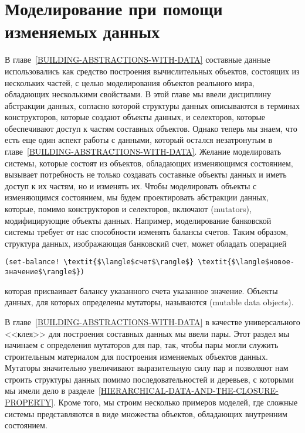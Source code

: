 \section{Моделирование при помощи изменяемых данных}%
\label{MODELING-WITH-MUTABLE-DATA}


В главе~\ref{BUILDING-ABSTRACTIONS-WITH-DATA}
составные данные использовались как средство построения вычислительных
объектов, состоящих из нескольких частей, с целью моделирования
объектов реального мира, обладающих несколькими свойствами. В этой
главе мы ввели дисциплину абстракции данных, согласно которой
структуры данных описываются в терминах конструкторов, которые создают
объекты данных, и селекторов, которые обеспечивают доступ к частям
составных объектов.  Однако теперь мы знаем, что есть еще один аспект
работы с данными, который остался незатронутым в
главе~\ref{BUILDING-ABSTRACTIONS-WITH-DATA}.  Желание
моделировать системы, которые состоят  из объектов, обладающих
изменяющимся состоянием, вызывает потребность не только создавать составные
объекты данных и иметь доступ к их частям, но и изменять их.
Чтобы моделировать объекты с изменяющимся состоянием, мы будем
проектировать абстракции данных, которые, помимо конструкторов и
селекторов, включают  (mutators),
модифицирующие объекты данных.  Например, моделирование банковской
системы требует от нас способности изменять балансы счетов.  Таким
образом, структура данных, изображающая банковский счет, может
обладать операцией

\begin{Verbatim}[fontsize=\small]
(set-balance! \textit{$\langle$счет$\rangle$} \textit{$\langle$новое-значение$\rangle$})
\end{Verbatim}
которая присваивает балансу указанного счета указанное значение.
Объекты данных, для которых определены мутаторы, называются
 (mutable data objects).

В главе~\ref{BUILDING-ABSTRACTIONS-WITH-DATA} в
качестве универсального <<клея>> для построения составных данных мы ввели
пары.  Этот раздел мы начинаем с определения мутаторов для
пар, так, чтобы пары могли служить строительным материалом для
построения изменяемых объектов данных.  Мутаторы значительно
увеличивают выразительную силу пар и позволяют нам строить структуры
данных помимо последовательностей и деревьев, с которыми мы имели дело
в разделе~\ref{HIERARCHICAL-DATA-AND-THE-CLOSURE-PROPERTY}.
Кроме того, мы строим несколько примеров моделей, где сложные
системы представляются в виде множества объектов, обладающих
внутренним состоянием.

